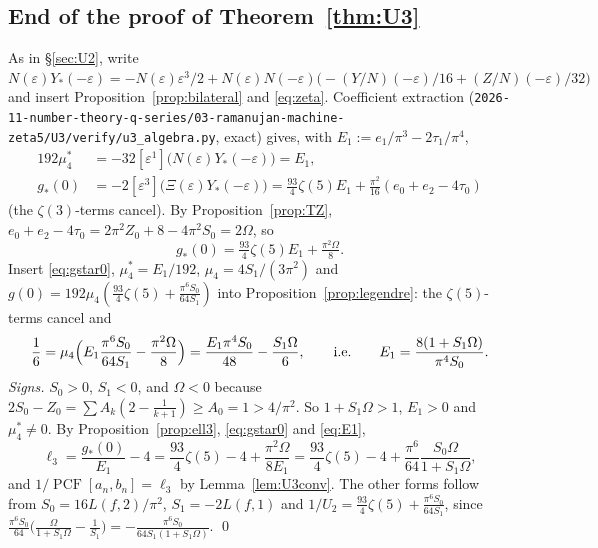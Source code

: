 \documentclass[11pt]{amsart}
\theoremstyle{definition}
\theoremstyle{remark}
\numberwithin{equation}{section}
\newcommand{\PCF}{\operatorname{PCF}}
\newcommand{\file}[1]{\nolinkurl{2026-11-number-theory-q-series/03-ramanujan-machine-zeta5/#1}}
\begin{document}
\subsection{End of the proof of Theorem~\ref*{thm:U3}}
As in \S\ref{sec:U2}, write $N(\varepsilon)Y_*(-\varepsilon)=-N(\varepsilon)\varepsilon^3/2+N(\varepsilon)N(-\varepsilon)\bigl(-(Y/N)(-\varepsilon)/16+(Z/N)(-\varepsilon)/32\bigr)$ and insert Proposition~\ref{prop:bilateral} and \eqref{eq:zeta}. Coefficient extraction (\file{U3/verify/u3_algebra.py}, exact) gives, with $E_1:=e_1/\pi^3-2\tau_1/\pi^4$,
\begin{align*}
192\mu_4^*&=-32[\varepsilon^1]\bigl(N(\varepsilon)Y_*(-\varepsilon)\bigr)=E_1,\\ g_*(0)&=-2[\varepsilon^3]\bigl(\Xi(\varepsilon)Y_*(-\varepsilon)\bigr)=\tfrac{93}4\zeta(5)E_1+\tfrac{\pi^2}{16}(e_0+e_2-4\tau_0)
\end{align*}
(the $\zeta(3)$-terms cancel). By Proposition~\ref{prop:TZ}, $e_0+e_2-4\tau_0=2\pi^2Z_0+8-4\pi^2S_0=2\Omega$, so
\begin{equation}\label{eq:gstar0}
g_*(0)=\tfrac{93}4\zeta(5)E_1+\tfrac{\pi^2\Omega}8 .
\end{equation}
Insert \eqref{eq:gstar0}, $\mu_4^*=E_1/192$, $\mu_4=4S_1/(3\pi^2)$ and $g(0)=192\mu_4(\frac{93}4\zeta(5)+\frac{\pi^6S_0}{64S_1})$ into Proposition~\ref{prop:legendre}: the $\zeta(5)$-terms cancel and
\begin{equation}\label{eq:E1}
\frac16=\mu_4\Bigl(E_1\frac{\pi^6S_0}{64S_1}-\frac{\pi^2\Omega}8\Bigr)=\frac{E_1\pi^4S_0}{48}-\frac{S_1\Omega}6,\qquad\text{i.e.}\qquad E_1=\frac{8(1+S_1\Omega)}{\pi^4S_0}.
\end{equation}
\emph{Signs.} $S_0>0$, $S_1<0$, and $\Omega<0$ because $2S_0-Z_0=\sum A_k(2-\frac1{k+1})\ge A_0=1>4/\pi^2$. So $1+S_1\Omega>1$, $E_1>0$ and $\mu_4^*\neq0$. By Proposition~\ref{prop:ell3}, \eqref{eq:gstar0} and \eqref{eq:E1},
\[
\ell_3=\frac{g_*(0)}{E_1}-4=\frac{93}4\zeta(5)-4+\frac{\pi^2\Omega}{8E_1}=\frac{93}4\zeta(5)-4+\frac{\pi^6}{64}\frac{S_0\Omega}{1+S_1\Omega},
\]
and $1/\PCF[a_n,b_n]=\ell_3$ by Lemma~\ref{lem:U3conv}. The other forms follow from $S_0=16L(f,2)/\pi^2$, $S_1=-2L(f,1)$ and $1/U_2=\frac{93}4\zeta(5)+\frac{\pi^6S_0}{64S_1}$, since $\frac{\pi^6S_0}{64}\bigl(\frac \Omega{1+S_1\Omega}-\frac1{S_1}\bigr)=-\frac{\pi^6S_0}{64S_1(1+S_1\Omega)}$. \qed
\end{document}

